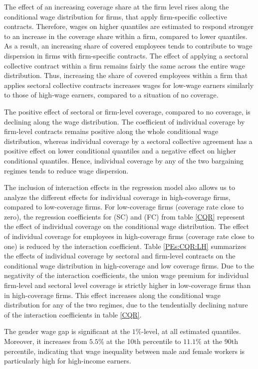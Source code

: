 The effect of an increasing coverage share at the firm level rises along the conditional wage distribution for firms, that apply firm-specific collective contracts. Therefore, wages on higher quantiles are estimated to respond stronger to an increase in the coverage share within a firm, compared to lower quantiles. As a result, an increasing share of covered employees tends to contribute to wage dispersion in firms with firm-specific contracts. The effect of applying a sectoral collective contract within a firm remains fairly the same across the entire wage distribution. Thus, increasing the share of covered employees within a firm that applies sectoral collective contracts increases wages for low-wage earners similarly to those of high-wage earners, compared to a situation of no coverage.

The positive effect of sectoral or firm-level coverage, compared to no coverage, is declining along the wage distribution. The coefficient of individual coverage by firm-level contracts remains positive along the whole conditional wage distribution, whereas individual coverage by a sectoral collective agreement has a positive effect on lower conditional quantiles and a negative effect on higher conditional quantiles. Hence, individual coverage by any of the two bargaining regimes tends to reduce wage dispersion.

The inclusion of interaction effects in the regression model also allows us to analyze the different effects for individual coverage in high-coverage firms, compared to low-coverage firms. For low-coverage firms (coverage rate close to zero), the regression coefficients for (SC) and (FC) from table \ref{CQR} represent the effect of individual coverage on the conditional wage distribution. The effect of individual coverage for employees in high-coverage firms (coverage rate close to one) is reduced by the interaction coefficient. Table \ref{PEs:CQR:LH} summarizes the effects of individual coverage by sectoral and firm-level contracts on the conditional wage distribution in high-coverage and low coverage firms. Due to the negativity of the interaction coefficients, the union wage premium for individual firm-level and sectoral level coverage is strictly higher in low-coverage firms than in high-coverage firms. This effect increases along the conditional wage distribution for any of the two regimes, due to the tendentially declining nature of the interaction coefficients in table \ref{CQR}.

The gender wage gap is significant at the $1\%$-level, at all estimated quantiles. Moreover, it increases from $5.5\%$ at the 10th percentile to $11.1\%$ at the 90th percentile, indicating that wage inequality between male and female workers is particularly high for high-income earners.

